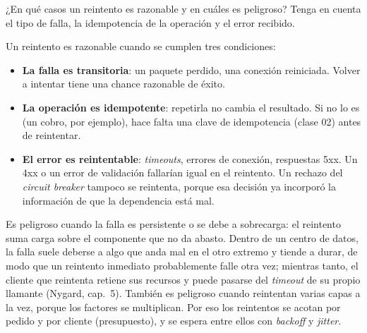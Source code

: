 \documentclass[variant=guia,cover=institutional,mode=screen]{ua-engineering-v6-article}
\begin{document}
\begin{uaexercise}
¿En qué casos un reintento es razonable y en cuáles es peligroso? Tenga en cuenta el tipo de falla, la idempotencia de la operación y el error recibido.
\end{uaexercise}
\begin{uaanswer}
Un reintento es razonable cuando se cumplen tres condiciones:
\begin{itemize}
\item \textbf{La falla es transitoria}: un paquete perdido, una conexión reiniciada. Volver a intentar tiene una chance razonable de éxito.
\item \textbf{La operación es idempotente}: repetirla no cambia el resultado. Si no lo es (un cobro, por ejemplo), hace falta una clave de idempotencia (clase 02) antes de reintentar.
\item \textbf{El error es reintentable}: \emph{timeouts}, errores de conexión, respuestas 5xx. Un 4xx o un error de validación fallarían igual en el reintento. Un rechazo del \emph{circuit breaker} tampoco se reintenta, porque esa decisión ya incorporó la información de que la dependencia está mal.
\end{itemize}

Es peligroso cuando la falla es persistente o se debe a sobrecarga: el reintento suma carga sobre el componente que no da abasto. Dentro de un centro de datos, la falla suele deberse a algo que anda mal en el otro extremo y tiende a durar, de modo que un reintento inmediato probablemente falle otra vez; mientras tanto, el cliente que reintenta retiene sus recursos y puede pasarse del \emph{timeout} de su propio llamante (Nygard, cap.~5). También es peligroso cuando reintentan varias capas a la vez, porque los factores se multiplican. Por eso los reintentos se acotan por pedido y por cliente (presupuesto), y se espera entre ellos con \emph{backoff} y \emph{jitter}.
\end{uaanswer}
\end{document}
